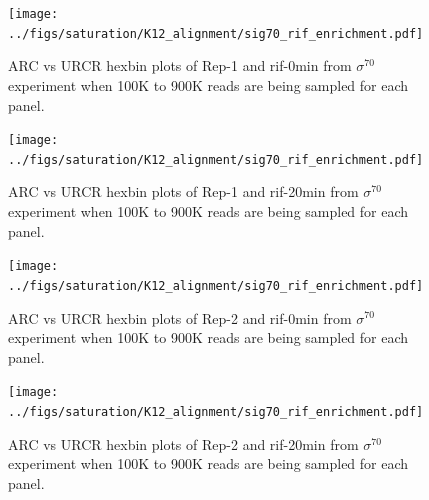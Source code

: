 \documentclass{bmcart}\usepackage[]{graphicx}\usepackage[]{color}
\newcommand{\sig}{\sigma^{70}}
\begin{document}

\newpage

\begin{figure}[h!]
  \centering
  \texttt{[image: ../figs/saturation/K12\_alignment/sig70\_rif\_enrichment.pdf]}
  \caption{ARC vs URCR hexbin plots of Rep-1 and rif-0min from $\sig$
    experiment when 100K to 900K reads are being sampled for each
    panel. }
  \label{fig:exoQC_sat1}
\end{figure}

\newpage

\begin{figure}[h!]
  \centering
  \texttt{[image: ../figs/saturation/K12\_alignment/sig70\_rif\_enrichment.pdf]}

  \caption{ARC vs URCR hexbin plots of Rep-1 and rif-20min from $\sig$ experiment when 100K to 900K reads are being
    sampled for each panel.}
  \label{fig:exoQC_sat2}
\end{figure}

\newpage

\begin{figure}[h!]
  \centering
  \texttt{[image: ../figs/saturation/K12\_alignment/sig70\_rif\_enrichment.pdf]}
  \caption{ARC vs URCR hexbin plots of Rep-2 and rif-0min from $\sig$
    experiment when 100K to 900K reads are being sampled for each
    panel.}
  \label{fig:exoQC_sat3}
\end{figure}

\newpage

\begin{figure}[h!]
  \centering
  \texttt{[image: ../figs/saturation/K12\_alignment/sig70\_rif\_enrichment.pdf]}
  \caption{ARC vs URCR hexbin plots of Rep-2 and rif-20min from $\sig$ experiment when 100K to 900K reads are being
    sampled for each panel.}
  \label{fig:exoQC_sat4}
\end{figure}
\end{document}
